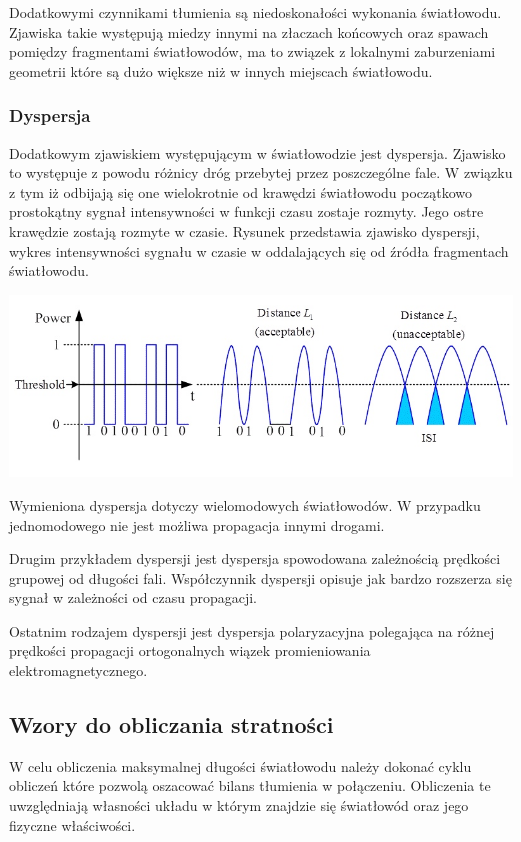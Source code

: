 \documentclass[paper=a4, fontsize=11pt]{scrartcl} %
\numberwithin{equation}{section} %
\numberwithin{figure}{section} %
\numberwithin{table}{section} %
\begin{document}
Dodatkowymi czynnikami tłumienia są niedoskonałości wykonania światłowodu. Zjawiska takie występują miedzy innymi na złaczach końcowych oraz spawach pomiędzy
fragmentami światłowodów, ma to związek z lokalnymi zaburzeniami geometrii które są dużo większe niż w innych miejscach światłowodu.

\subsubsection{Dyspersja}

Dodatkowym zjawiskiem występującym w światłowodzie jest dyspersja. Zjawisko to występuje z powodu różnicy dróg przebytej przez poszczególne fale.
W związku z tym iż odbijają się one wielokrotnie od krawędzi światłowodu początkowo prostokątny sygnał intensywności w funkcji czasu zostaje rozmyty.
Jego ostre krawędzie zostają rozmyte w czasie. Rysunek przedstawia zjawisko dyspersji, wykres intensywności sygnału w czasie w oddalających się od źródła
fragmentach światłowodu.

\includegraphics[width=\textwidth]{2}

Wymieniona dyspersja dotyczy wielomodowych światłowodów. W przypadku jednomodowego nie jest możliwa propagacja innymi drogami.

Drugim przykładem dyspersji jest dyspersja spowodowana zależnością prędkości grupowej od długości fali.
Współczynnik dyspersji opisuje jak bardzo rozszerza się sygnał w zależności od czasu propagacji.

Ostatnim rodzajem dyspersji jest dyspersja polaryzacyjna polegająca na różnej prędkości propagacji ortogonalnych wiązek promieniowania elektromagnetycznego.
  
\subsection{Wzory do obliczania stratności}

W celu obliczenia maksymalnej długości światłowodu należy dokonać cyklu obliczeń które pozwolą oszacować bilans tłumienia w połączeniu.
Obliczenia te uwzględniają własności układu w którym znajdzie się światłowód oraz jego fizyczne właściwości.
\end{document}
